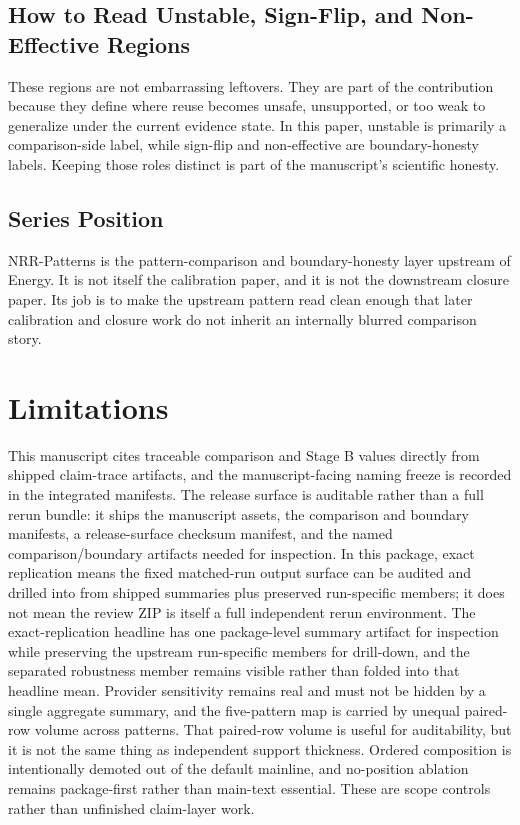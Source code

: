 \documentclass[11pt,a4paper]{article}
\begin{document}
\subsection{How to Read Unstable, Sign-Flip, and Non-Effective Regions}

These regions are not embarrassing leftovers. They are part of the contribution because they define where reuse becomes unsafe, unsupported, or too weak to generalize under the current evidence state. In this paper, unstable is primarily a comparison-side label, while sign-flip and non-effective are boundary-honesty labels. Keeping those roles distinct is part of the manuscript's scientific honesty.

\subsection{Series Position}

NRR-Patterns is the pattern-comparison and boundary-honesty layer upstream of Energy. It is not itself the calibration paper, and it is not the downstream closure paper. Its job is to make the upstream pattern read clean enough that later calibration and closure work do not inherit an internally blurred comparison story.

\section{Limitations}
\label{sec:limitations}

This manuscript cites traceable comparison and Stage B values directly from shipped claim-trace artifacts, and the manuscript-facing naming freeze is recorded in the integrated manifests. The release surface is auditable rather than a full rerun bundle: it ships the manuscript assets, the comparison and boundary manifests, a release-surface checksum manifest, and the named comparison/boundary artifacts needed for inspection. In this package, exact replication means the fixed matched-run output surface can be audited and drilled into from shipped summaries plus preserved run-specific members; it does not mean the review ZIP is itself a full independent rerun environment. The exact-replication headline has one package-level summary artifact for inspection while preserving the upstream run-specific members for drill-down, and the separated robustness member remains visible rather than folded into that headline mean. Provider sensitivity remains real and must not be hidden by a single aggregate summary, and the five-pattern map is carried by unequal paired-row volume across patterns. That paired-row volume is useful for auditability, but it is not the same thing as independent support thickness. Ordered composition is intentionally demoted out of the default mainline, and no-position ablation remains package-first rather than main-text essential. These are scope controls rather than unfinished claim-layer work.
\end{document}
